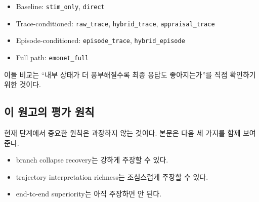 \begin{itemize}
  \item Baseline: \texttt{stim\_only}, \texttt{direct}
  \item Trace-conditioned: \texttt{raw\_trace}, \texttt{hybrid\_trace}, \texttt{appraisal\_trace}
  \item Episode-conditioned: \texttt{episode\_trace}, \texttt{hybrid\_episode}
  \item Full path: \texttt{emonet\_full}
\end{itemize}

이들 비교는 ``내부 상태가 더 풍부해질수록 최종 응답도 좋아지는가''를 직접 확인하기 위한 것이다.

\subsection{이 원고의 평가 원칙}

현재 단계에서 중요한 원칙은 과장하지 않는 것이다. 본문은 다음 세 가지를 함께 보여준다.

\begin{itemize}
  \item branch collapse recovery는 강하게 주장할 수 있다.
  \item trajectory interpretation richness는 조심스럽게 주장할 수 있다.
  \item end-to-end superiority는 아직 주장하면 안 된다.
\end{itemize}
